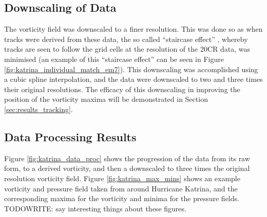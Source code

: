 \documentclass[pdftex,12pt,a4paper]{report}
\begin{document}
\subsection{Downscaling of Data}

The vorticity field was downscaled to a finer resolution. This was done so as when tracks were
derived from these data, the so called ``staircase effect'' \parencite{hodges1994general}, whereby
tracks are seen to follow the grid cells at the resolution of the 20CR data, was minimised (an
example of this ``staircase effect'' can be seen in Figure \ref{fig:katrina_individual_match_em7}).
This downscaling was accomplished using a cubic spline interpolation, and the data were downscaled
to two and three times their original resolutions. The efficacy of this downscaling in improving the
position of the vorticity maxima will be demonstrated in Section \ref{sec:results_tracking}.

\subsection{Data Processing Results}

Figure \ref{fig:katrina_data_proc} shows the progression of the data from its raw form, to a derived
vorticity, and then a downscaled to three times the original resolution vorticity field. Figure
\ref{fig:katrina_max_mins} shows an example vorticity and pressure field taken from around Hurricane
Katrina, and the corresponding maxima for the vorticity and minima for the pressure fields.
TODOWRITE:
say interesting things about these figures.
\end{document}

